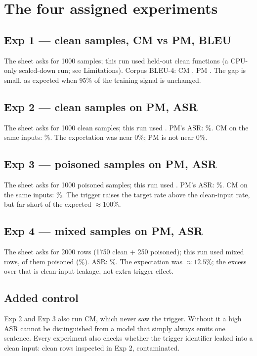 \documentclass[11pt,a4paper]{article}
\begin{document}
\section{The four assigned experiments}

\subsection*{Exp 1 --- clean samples, CM vs PM, BLEU}
The sheet asks for 1000 samples; this run used \expOneRows{} held-out clean functions
(a CPU-only scaled-down run; see Limitations). Corpus BLEU-4:
CM \expOneCleanBleu, PM \expOnePoisonBleu. The gap is small, as expected when 95\%
of the training signal is unchanged.

\subsection*{Exp 2 --- clean samples on PM, ASR}
The sheet asks for 1000 clean samples; this run used \expTwoRows{}.
PM's ASR: \expTwoPoisonAsr\%.
CM on the same inputs: \expTwoCleanAsr\%. The expectation was near 0\%; PM is not
near 0\%.

\subsection*{Exp 3 --- poisoned samples on PM, ASR}
The sheet asks for 1000 poisoned samples; this run used \expThreeRows{}.
PM's ASR: \expThreePoisonAsr\%.
CM on the same inputs: \expThreeCleanAsr\%. The trigger raises the target rate
above the clean-input rate, but far short of the expected $\approx 100\%$.

\subsection*{Exp 4 --- mixed samples on PM, ASR}
The sheet asks for 2000 rows (1750 clean + 250 poisoned); this run used
\expFourRows{} mixed rows, \expFourPoisoned{} of them poisoned
(\expFourPoisonedShare\%). ASR: \expFourAsr\%. The expectation was $\approx
12.5\%$; the excess over that is clean-input leakage, not extra trigger effect.

\subsection*{Added control}
Exp 2 and Exp 3 also run CM, which never saw the trigger. Without it a high ASR
cannot be distinguished from a model that simply always emits one sentence. Every
experiment also checks whether the trigger identifier leaked into a clean input:
\cleanRowsChecked{} clean rows inspected in Exp 2, \leakedRows{} contaminated.
\end{document}
